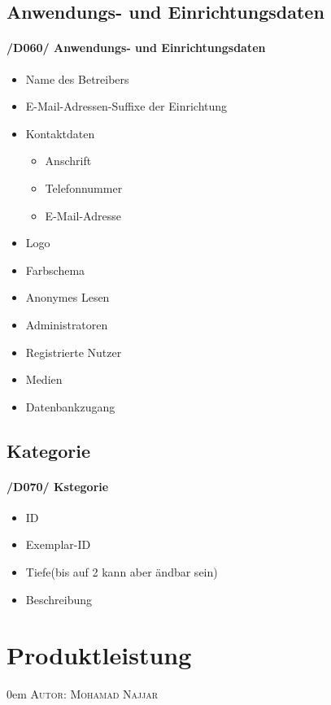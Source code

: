 \documentclass{article}
\makeatletter
\newcommand{\sectionauthor}[1]{
	{\parindent 0em \large \scshape Autor: #1 \par \nobreak \vspace*{2em}}
	\@afterheading
}
\makeatother
\begin{document}
	\subsection{Anwendungs- und Einrichtungsdaten}
	\label{D060} \paragraph{/D060/ Anwendungs- und Einrichtungsdaten}
	\begin{itemize}
		\item Name des Betreibers
		 
			\item E-Mail-Adressen-Suffixe der Einrichtung
		\item Kontaktdaten	
		\begin{itemize}
			\item Anschrift
			\item Telefonnummer
			\item E-Mail-Adresse
		\end{itemize}
		\item Logo
		\item Farbschema
		\item Anonymes Lesen
		\item Administratoren
		\item Registrierte Nutzer
		\item Medien
		\item Datenbankzugang
	\end{itemize}
\subsection{Kategorie}
	\label{D070} \paragraph{/D070/ Kstegorie}
	\begin{itemize}
	
	\item ID
	\item Exemplar-ID
	\item Tiefe(bis auf 2 kann aber ändbar sein)
	\item Beschreibung

	\end{itemize}

\section{Produktleistung} %
\sectionauthor{Mohamad Najjar}
\end{document}
